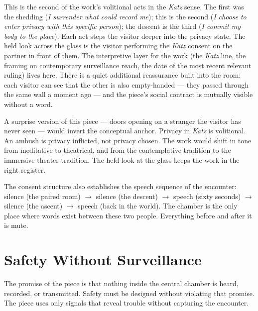 \documentclass[10pt, letterpaper]{article}
\begin{document}
This is the second of the work's volitional acts in the \textit{Katz} sense. The first was the shedding (\textit{I surrender what could record me}); this is the second (\textit{I choose to enter privacy with this specific person}); the descent is the third (\textit{I commit my body to the place}). Each act steps the visitor deeper into the privacy state. The held look across the glass is the visitor performing the \textit{Katz} consent on the partner in front of them. The interpretive layer for the work (the \textit{Katz} line, the framing on contemporary surveillance reach, the date of the most recent relevant ruling) lives here. There is a quiet additional reassurance built into the room: each visitor can see that the other is also empty-handed --- they passed through the same wall a moment ago --- and the piece's social contract is mutually visible without a word.

A surprise version of this piece --- doors opening on a stranger the visitor has never seen --- would invert the conceptual anchor. Privacy in \textit{Katz} is volitional. An ambush is privacy inflicted, not privacy chosen. The work would shift in tone from meditative to theatrical, and from the contemplative tradition to the immersive-theater tradition. The held look at the glass keeps the work in the right register.

The consent structure also establishes the speech sequence of the encounter: silence (the paired room) $\rightarrow$ silence (the descent) $\rightarrow$ speech (sixty seconds) $\rightarrow$ silence (the ascent) $\rightarrow$ speech (back in the world). The chamber is the only place where words exist between these two people. Everything before and after it is mute.

\section{Safety Without Surveillance}

The promise of the piece is that nothing inside the central chamber is heard, recorded, or transmitted. Safety must be designed without violating that promise. The piece uses only signals that reveal trouble without capturing the encounter.
\end{document}
